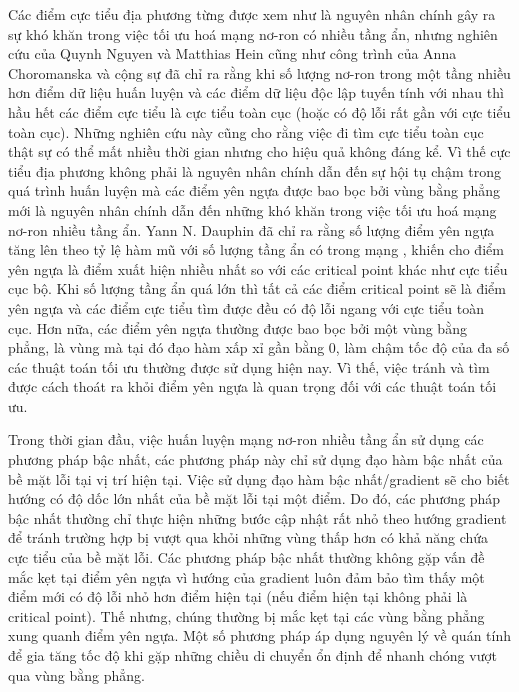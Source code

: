 Các điểm cực tiểu địa phương từng được xem như là nguyên nhân chính gây ra sự khó khăn trong việc tối ưu hoá mạng nơ-ron có nhiều tầng ẩn, nhưng nghiên cứu của Quynh Nguyen và Matthias Hein \cite{nguyen2017thelosssurface} cũng như công trình của Anna Choromanska và cộng sự \cite{choromanska2014thelosssurface} đã chỉ ra rằng khi số lượng nơ-ron trong một tầng nhiều hơn điểm dữ liệu huấn luyện và các điểm dữ liệu độc lập tuyến tính với nhau thì hầu hết các điểm cực tiểu là cực tiểu toàn cục (hoặc có độ lỗi rất gần với cực tiểu toàn cục). Những nghiên cứu này cũng cho rằng việc đi tìm cực tiểu toàn cục thật sự có thể mất nhiều thời gian nhưng cho hiệu quả không đáng kể. Vì thế cực tiểu địa phương không phải là nguyên nhân chính dẫn đến sự hội tụ chậm trong quá trình huấn luyện mà các điểm yên ngựa được bao bọc bởi vùng bằng phẳng mới là nguyên nhân chính dẫn đến những khó khăn trong việc tối ưu hoá mạng nơ-ron nhiều tầng ẩn. Yann N. Dauphin đã chỉ ra rằng số lượng điểm yên ngựa tăng lên theo tỷ lệ hàm mũ với số lượng tầng ẩn có trong mạng \cite{dauphin2014identifying}, khiến cho điểm yên ngựa là điểm xuất hiện nhiều nhất so với các critical point khác như cực tiểu cục bộ. Khi số lượng tầng ẩn quá lớn thì tất cả các điểm critical point sẽ là điểm yên ngựa và các điểm cực tiểu tìm được đều có độ lỗi ngang với cực tiểu toàn cục. Hơn nữa, các điểm yên ngựa thường được bao bọc bởi một vùng bằng phẳng, là vùng mà tại đó đạo hàm xấp xỉ gần bằng 0, làm chậm tốc độ của đa số các thuật toán tối ưu thường được sử dụng hiện nay. Vì thế, việc tránh và tìm được cách thoát ra khỏi điểm yên ngựa là quan trọng đối với các thuật toán tối ưu.

Trong thời gian đầu, việc huấn luyện mạng nơ-ron nhiều tầng ẩn sử dụng các phương pháp bậc nhất, các phương pháp này chỉ sử dụng đạo hàm bậc nhất của bề mặt lỗi tại vị trí hiện tại. Việc sử dụng đạo hàm bậc nhất/gradient sẽ cho biết hướng có độ dốc lớn nhất của bề mặt lỗi tại một điểm. Do đó, các phương pháp bậc nhất thường chỉ thực hiện những bước cập nhật rất nhỏ theo hướng gradient để tránh trường hợp bị vượt qua khỏi những vùng thấp hơn có khả năng chứa cực tiểu của bề mặt lỗi. Các phương pháp bậc nhất thường không gặp vấn đề mắc kẹt tại điểm yên ngựa vì hướng của gradient luôn đảm bảo tìm thấy một điểm mới có độ lỗi nhỏ hơn điểm hiện tại (nếu điểm hiện tại không phải là critical point). Thế nhưng, chúng thường bị mắc kẹt tại các vùng bằng phẳng xung quanh điểm yên ngựa. Một số phương pháp áp dụng nguyên lý về quán tính để gia tăng tốc độ khi gặp những chiều di chuyển ổn định để nhanh chóng vượt qua vùng bằng phẳng.

